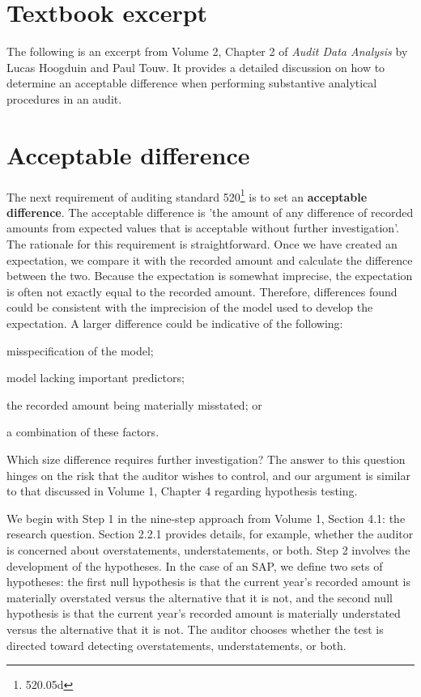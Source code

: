 \documentclass[12pt,a4paper]{memoir}
\begin{document}
\section*{Textbook excerpt}

The following is an excerpt from Volume 2, Chapter 2 of \textit{Audit Data Analysis} by Lucas Hoogduin and Paul Touw. It provides a detailed discussion on how to determine an acceptable difference when performing substantive analytical procedures in an audit.

\section{Acceptable difference} %
\label{sub:acceptable_difference}

The next requirement of auditing standard 520\footnote{520.05d} is to set an \textbf{acceptable difference}. 
The acceptable difference is 'the amount of any difference of recorded amounts from expected values that is acceptable without further investigation'. 
The rationale for this requirement is straightforward. 
Once we have created an expectation, we compare it with the recorded amount and calculate the difference between the two. 
Because the expectation is somewhat imprecise, the expectation is often not exactly equal to the recorded amount. 
Therefore, differences found could be consistent with the imprecision of the model used to develop the expectation. 
A larger difference could be indicative of the following:

\begin{compactitem}
\item misspecification of the model;
\item model lacking important predictors;
\item the recorded amount being materially misstated; or
\item a combination of these factors. 
\end{compactitem}

\bigskip
Which size difference requires further investigation? The answer to this question hinges on the risk that the auditor wishes to control, and our argument is similar to that discussed in Volume 1, Chapter 4 regarding hypothesis testing. 

We begin with Step 1 in the nine-step approach from Volume 1, Section 4.1: the research question. Section 2.2.1 provides details, for example, whether the auditor is concerned about overstatements, understatements, or both.
Step 2 involves the development of the hypotheses. In the case of an SAP, we define two sets of hypotheses: the first null hypothesis is that the current year’s recorded amount is materially overstated versus the alternative that it is not, and the second null hypothesis is that the current year’s recorded amount is materially understated versus the alternative that it is not. The auditor chooses whether the test is directed toward detecting overstatements, understatements, or both.
\end{document}
